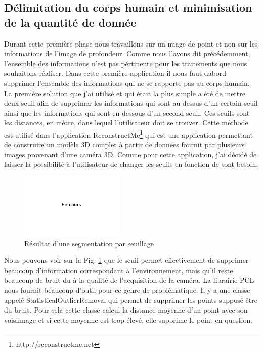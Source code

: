 \subsection{Délimitation du corps humain et minimisation de la quantité de donnée}
Durant cette première phase nous travaillons sur un nuage de point et non sur les informations de l'image de profondeur.
Comme nous l'avons dit précédemment, l'ensemble des informations n'est pas pértinente pour les traitements que nous souhaitons
réaliser. Dans cette première application il nous faut dabord supprimer l'ensemble des informations qui ne se rapporte pas 
au corps humain. La première solution que j'ai utilisé et qui était la plus simple a été de mettre deux seuil afin de 
supprimer les informations qui sont au-dessus d'un certain seuil ainsi que les informations qui sont en-dessous d'un second
seuil. Ces seuils sont les distances, en mètre, dans lequel l'utilisateur doit se trouver. Cette méthode est utilisé dans 
l'application ReconstructMe\footnote{http://reconstructme.net} qui est une application permettant de construire un modèle
3D complet à partir de données fournit par plusieurs images provenant d'une caméra 3D. Comme pour cette application, j'ai
décidé de laisser la possibilité à l'utilisateur de changer les seuils en fonction de sont besoin.\\

\begin{figure}[!ht]
  \begin{center}
    \includegraphics[width=5cm]{image/wait.png}
    \caption{Résultat d'une segmentation par seuillage}
    \label{fig:seuillage}
  \end{center}
\end{figure}

Nous pouvons voir sur la Fig. \ref{fig:seuillage} que le seuil permet effectivement de supprimer beaucoup d'information
correspondant à l'environnement, mais qu'il reste beaucoup de bruit du à la qualité de l'acquisition de la caméra. La librairie
PCL\cite{PCL} nous fournit beaucoup d'outil pour ce genre de problèmatique. Il y a une classe appelé StatisticalOutlierRemoval
qui permet de supprimer les points supposé être du bruit. Pour cela cette classe calcul la distance moyenne d'un point avec son
voisinnage et si cette moyenne est trop élevé, elle supprime le point en question.\\

